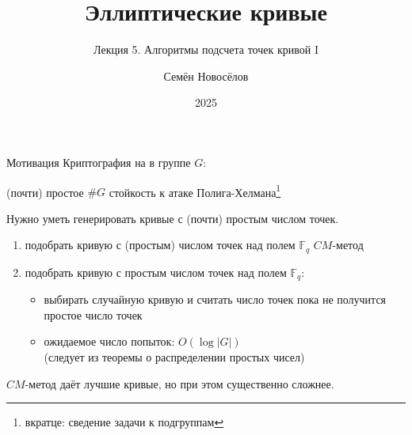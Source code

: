 \documentclass{beamer}
\title{Эллиптические кривые}
\subtitle{Лекция 5. Алгоритмы подсчета точек кривой I}
\author{Семён Новосёлов}
\institute{БФУ им. И. Канта}
\date{2025}
\begin{document}
\frame{\titlepage}

\begin{frame}{Мотивация}
    Криптография на  в группе $G$:
    \begin{center}
    (почти) простое $\#G$ \structure{$\implies$} стойкость к атаке Полига-Хелмана\footnote{вкратце: сведение задачи к подгруппам}
 
    \vspace{1em}
    \structure{$\Downarrow$}
    \end{center}
    
    Нужно уметь генерировать кривые с (почти) простым числом точек.
\end{frame}

\begin{frame}
	\begin{enumerate}
		\item подобрать кривую с  (простым) числом точек над полем $\mathbb{F}_q$ \structure{$\implies$} $CM$-метод
		\vspace{0.5em}
		\item подобрать кривую с простым числом точек над полем $\mathbb{F}_q$:
		\begin{itemize}
			\item выбирать случайную кривую и считать число точек пока не получится простое число точек
			\item ожидаемое число попыток: $O(\log{|G|})$\\(следует из теоремы о распределении простых чисел)
		\end{itemize}
	\end{enumerate}
	\vspace{0.5em}
	$CM$-метод даёт лучшие кривые, но при этом существенно сложнее.
\end{frame}
\end{document}
